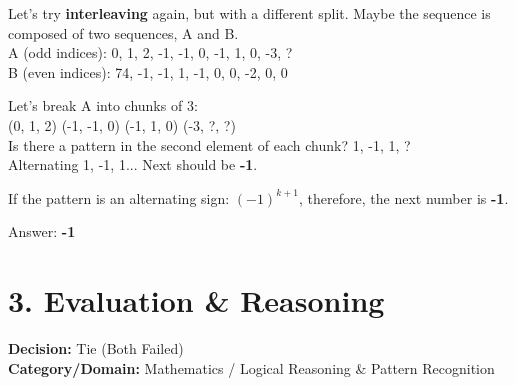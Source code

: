 \documentclass[11pt, a4paper]{article}
\begin{document}
\begin{mdframed}[backgroundcolor=modelBcolor, linecolor=green!20, roundcorner=5pt, innertopmargin=10pt, innerbottommargin=10pt, innerleftmargin=10pt, innerrightmargin=10pt]
Let's try \textbf{interleaving} again, but with a different split. Maybe the sequence is composed of two sequences, A and B. \\
A (odd indices): 0, 1, 2, -1, -1, 0, -1, 1, 0, -3, ? \\
B (even indices): 74, -1, -1, 1, -1, 0, 0, -2, 0, 0

Let's break A into chunks of 3: \\
(0, 1, 2) \quad (-1, -1, 0) \quad (-1, 1, 0) \quad (-3, ?, ?) \\
Is there a pattern in the second element of each chunk? 1, -1, 1, ? \\
Alternating 1, -1, 1... Next should be \textbf{-1}.

If the pattern is an alternating sign: $(-1)^{k+1}$, therefore, the next number is \textbf{-1}.

Answer: \textbf{-1}
\end{mdframed}

\vspace{0.5cm}

\section*{3. Evaluation \& Reasoning}

\textbf{Decision:} Tie (Both Failed) \\
\textbf{Category/Domain:} Mathematics / Logical Reasoning \& Pattern Recognition
\end{document}
